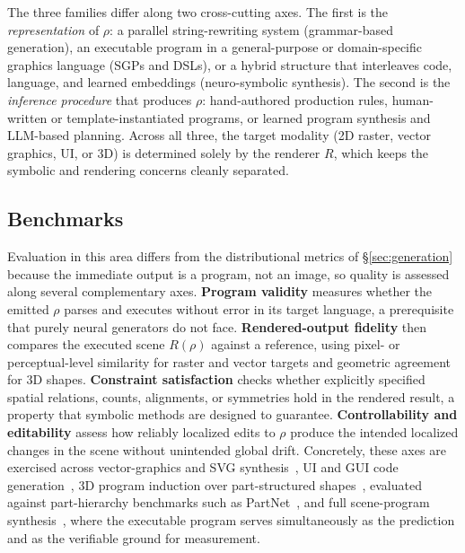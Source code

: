 The three families differ along two cross-cutting axes.
The first is the \emph{representation} of $\rho$: a parallel string-rewriting system (grammar-based generation), an executable program in a general-purpose or domain-specific graphics language (SGPs and DSLs), or a hybrid structure that interleaves code, language, and learned embeddings (neuro-symbolic synthesis).
The second is the \emph{inference procedure} that produces $\rho$: hand-authored production rules, human-written or template-instantiated programs, or learned program synthesis and LLM-based planning. Across all three, the target modality (2D raster, vector graphics, UI, or 3D) is determined solely by the renderer $R$, which keeps the symbolic and rendering concerns cleanly separated.



\subsection{Benchmarks}
\label{subsubsec:p3_s8_7_benchmarks}

Evaluation in this area differs from the distributional metrics of §\ref{sec:generation} because the immediate output is a program, not an image, so quality is assessed along several complementary axes.
\textbf{Program validity} measures whether the emitted $\rho$ parses and executes without error in its target language, a prerequisite that purely neural generators do not face.
\textbf{Rendered-output fidelity} then compares the executed scene $R(\rho)$ against a reference, using pixel- or perceptual-level similarity for raster and vector targets and geometric agreement for 3D shapes.
\textbf{Constraint satisfaction} checks whether explicitly specified spatial relations, counts, alignments, or symmetries hold in the rendered result, a property that symbolic methods are designed to guarantee.
\textbf{Controllability and editability} assess how reliably localized edits to $\rho$ produce the intended localized changes in the scene without unintended global drift. Concretely, these axes are exercised across vector-graphics and SVG synthesis~\cite{bing2025learning}, UI and GUI code generation~\cite{zhu2018automatic, chen2025designcoder}, 3D program induction over part-structured shapes~\cite{jones2020shapeassembly}, evaluated against part-hierarchy benchmarks such as PartNet~\cite{mo2019partnet}, and full scene-program synthesis~\cite{zhang2025scenelanguage, yang2024holodeck}, where the executable program serves simultaneously as the prediction and as the verifiable ground for measurement.

